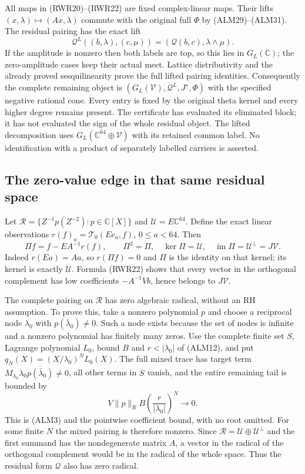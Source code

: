 All maps in (RWR20)--(RWR22) are fixed complex-linear maps. Their lifts
$(x,\lambda)\mapsto(Ax,\lambda)$ commute with the original full
$\Phi$ by (ALM29)--(ALM31). The residual pairing has the exact lift
\begin{equation}\tag{RWR24}
 \mathscr Q^L((b,\lambda),(c,\mu))=
          (\mathscr Q(b,c),\lambda\wedge\mu).
\end{equation}
If the amplitude is nonzero then both labels are top, so this lies
in $G_L(\mathbb C)$; the zero-amplitude cases keep their actual meet.
Lattice distributivity and the already proved sesquilinearity prove
the full lifted pairing identities. Consequently the complete remaining
object is $(G_L(\mathscr V),\mathscr Q^L,J^\uparrow,\Phi)$ with the
specified negative rational cone. Every entry is fixed by the original
theta kernel and every higher degree remains present. The certificate
has evaluated its eliminated block; it has not evaluated the sign of
the whole residual object.
The lifted decomposition uses $G_L(\mathbb C^{64}\oplus\mathscr V)$
with its retained common label. No identification with a product of
separately labelled carriers is asserted.

\subsection{The zero-value edge in that same residual space}
Let $\mathscr R=\{Z^{-1}p(Z^{-2}):p\in\mathbb C[X]\}$ and
$\mathscr U=E\mathbb C^{64}$. Define the exact linear observations
$r(f)_a=\mathcal T_0(Ee_a,f)$, $0\le a<64$. Then
\begin{equation}\tag{RWR25}
 \Pi f=f-EA^{-1}r(f),\qquad
 \Pi^2=\Pi,\quad\ker\Pi=\mathscr U,\quad
 \operatorname{im}\Pi=\mathscr U^\perp=J\mathscr V.
\end{equation}
Indeed $r(Ea)=Aa$, so $r(\Pi f)=0$ and $\Pi$ is the identity
on that kernel; its kernel is exactly $\mathscr U$. Formula (RWR22)
shows that every vector in the orthogonal complement has low coefficients
$-A^{-1}Vb$, hence belongs to $J\mathscr V$.

The complete pairing on $\mathscr R$ has zero algebraic radical,
without an RH assumption. To prove this, take a nonzero polynomial $p$
and choose a reciprocal node $\lambda_0$ with
$p(\bar\lambda_0)\ne0$. Such a node exists because the set of
nodes is infinite and a nonzero polynomial has finitely many zeros.
Use the complete finite set $S$, Lagrange polynomial $L_0$, bound $B$
and $r<|\lambda_0|$ of (ALM12), and put
$q_N(X)=(X/\lambda_0)^NL_0(X)$. The full mixed trace has target
term $M_{\lambda_0}\lambda_0\overline{p(\bar\lambda_0)}\ne0$,
all other terms in $S$ vanish, and the entire remaining tail is bounded by
\begin{equation}\tag{RWR26}
 V\|p\|_R B\left(\frac r{|\lambda_0|}\right)^N\longrightarrow0.
\end{equation}
This is (ALM3) and the pointwise coefficient bound, with no root omitted.
For some finite $N$ the mixed pairing is therefore nonzero.
Since $\mathscr R=\mathscr U\oplus\mathscr U^\perp$ and the first
summand has the nondegenerate matrix $A$, a vector in the radical of
the orthogonal complement would be in the radical of the whole space.
Thus the residual form $\mathscr Q$ also has zero radical.

